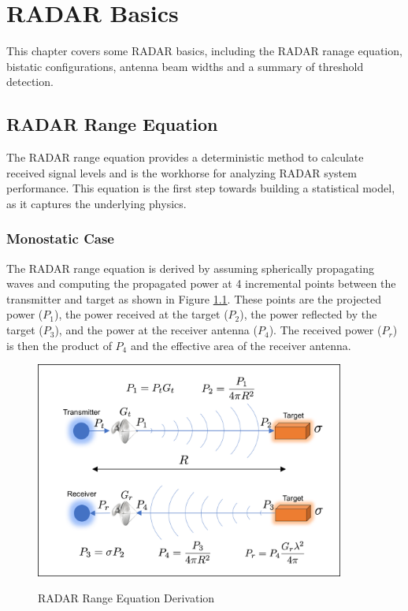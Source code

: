 \renewcommand{\baselinestretch}{2} \small\normalsize
\chapter{RADAR Basics}
This chapter covers some RADAR basics, including the RADAR ranage equation, bistatic configurations, antenna beam widths and a summary of threshold detection.

\section{RADAR Range Equation} 
The RADAR range equation provides a deterministic method to calculate received signal levels and is the workhorse for analyzing RADAR system performance. This equation is the first step towards building a statistical model, as it captures the underlying physics.

\subsection{Monostatic Case}
The RADAR range equation is derived by assuming spherically propagating waves and computing the propagated power at 4 incremental points between the transmitter and target as shown in Figure \ref{intro_fig:1}. These points are the projected power ($P_1$), the power received at the target ($P_2$), the power reflected by the target ($P_3$), and the power at the receiver antenna ($P_4$). The received power ($P_r$) is then the product of $P_4$ and the effective area of the receiver antenna.

\begin{figure}[H]
  \begin{center}
\includegraphics[width=4in]{../media/multistatic/radar_range_equation.png}
  \end{center}
  \renewcommand{\baselinestretch}{1} \small\normalsize
  \begin{quote}
    \caption[RADAR Range Equation Derivation]{RADAR Range Equation Derivation \label{intro_fig:1}}
  \end{quote}
\end{figure}
\renewcommand{\baselinestretch}{2} \small\normalsize

